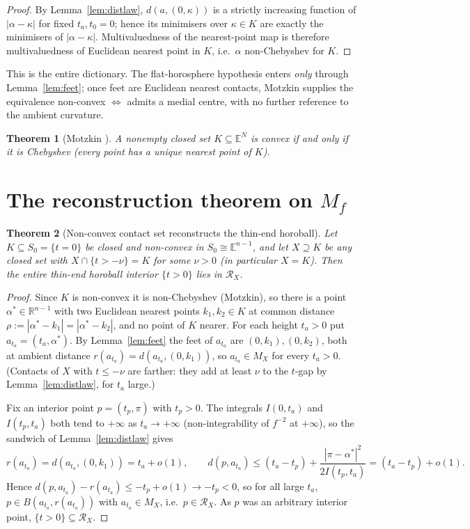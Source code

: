 \documentclass[11pt]{article}
\newtheorem{theorem}{Theorem}[section]
\theoremstyle{remark}
\newcommand{\R}{\mathbb{R}}
\newcommand{\X}{X}
\newcommand{\Mx}{M_{\X}}
\newcommand{\Rx}{\mathcal{R}_{\X}}
\newcommand{\Sb}[1]{S_{#1}}
\newcommand{\Mf}{M_{f}}
\newcommand{\E}{\mathbb{E}}
\begin{document}
\begin{proof}
By Lemma~\ref{lem:distlaw}, $d(a,(0,\kappa))$ is a strictly increasing
function of $|\alpha-\kappa|$ for fixed $t_{a},t_{0}=0$; hence its
minimisers over $\kappa\in K$ are exactly the minimisers of
$|\alpha-\kappa|$. Multivaluedness of the nearest-point map is
therefore multivaluedness of Euclidean nearest point in $K$, i.e.\
$\alpha$ non-Chebyshev for $K$.
\end{proof}

This is the entire dictionary. The flat-horosphere hypothesis enters
\emph{only} through Lemma~\ref{lem:feet}; once feet are Euclidean
nearest contacts, Motzkin supplies the equivalence non-convex
$\Leftrightarrow$ admits a medial centre, with no further reference to
the ambient curvature.

\begin{theorem}[Motzkin {\cite{Mot}}]\label{thm:motzkin}
A nonempty closed set $K\subseteq\E^{N}$ is convex if and only if it is
Chebyshev (every point has a unique nearest point of $K$).
\end{theorem}

\section{The reconstruction theorem on \texorpdfstring{$\Mf$}{Mf}}
\label{sec:recon}

\begin{theorem}[Non-convex contact set reconstructs the thin-end
horoball]\label{thm:mf-suff}
Let $K\subseteq\Sb{0}=\{t=0\}$ be closed and non-convex in
$\Sb{0}\cong\E^{n-1}$, and let $\X\supseteq K$ be any closed set with
$\X\cap\{t>-\nu\}=K$ for some $\nu>0$ (in particular $\X=K$). Then the
entire thin-end horoball interior $\{t>0\}$ lies in $\Rx$.
\end{theorem}

\begin{proof}
Since $K$ is non-convex it is non-Chebyshev (Motzkin), so there is a
point $\alpha^{\ast}\in\R^{n-1}$ with two Euclidean nearest points
$k_{1},k_{2}\in K$ at common distance
$\rho:=|\alpha^{\ast}-k_{1}|=|\alpha^{\ast}-k_{2}|$, and no point of
$K$ nearer. For each height $t_{a}>0$ put
$a_{t_{a}}=(t_{a},\alpha^{\ast})$. By Lemma~\ref{lem:feet} the feet of
$a_{t_{a}}$ are $(0,k_{1}),(0,k_{2})$, both at ambient distance
$r(a_{t_{a}})=d(a_{t_{a}},(0,k_{1}))$, so $a_{t_{a}}\in\Mx$ for every
$t_{a}>0$. (Contacts of $\X$ with $t\le-\nu$ are farther: they add at
least $\nu$ to the $t$-gap by Lemma~\ref{lem:distlaw}, for $t_{a}$
large.)

Fix an interior point $p=(t_{p},\pi)$ with $t_{p}>0$. The integrals
$I(0,t_{a})$ and $I(t_{p},t_{a})$ both tend to $+\infty$ as
$t_{a}\to+\infty$ (non-integrability of $f^{-2}$ at $+\infty$), so the
sandwich of Lemma~\ref{lem:distlaw} gives
\[
  r(a_{t_{a}})=d(a_{t_{a}},(0,k_{1}))=t_{a}+o(1),
  \qquad
  d(p,a_{t_{a}})\le(t_{a}-t_{p})+\frac{|\pi-\alpha^{\ast}|^{2}}
  {2I(t_{p},t_{a})}=(t_{a}-t_{p})+o(1).
\]
Hence $d(p,a_{t_{a}})-r(a_{t_{a}})\le-t_{p}+o(1)\to-t_{p}<0$, so for
all large $t_{a}$, $p\in B(a_{t_{a}},r(a_{t_{a}}))$ with
$a_{t_{a}}\in\Mx$, i.e.\ $p\in\Rx$. As $p$ was an arbitrary interior
point, $\{t>0\}\subseteq\Rx$.
\end{proof}
\end{document}

